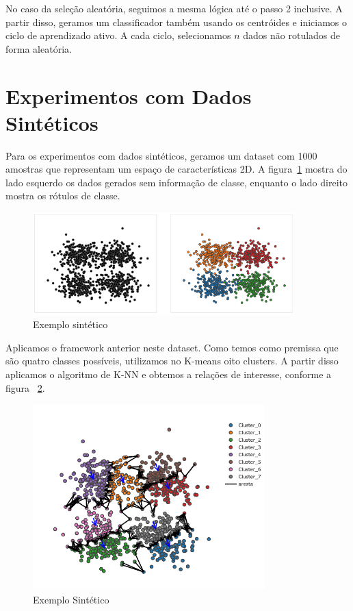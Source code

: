 
No caso da seleção aleatória, seguimos a mesma lógica até o passo 2 inclusive. A partir disso, geramos um classificador também usando os centróides e iniciamos o ciclo de aprendizado ativo. A cada ciclo, selecionamos $n$ dados não rotulados de forma aleatória.

\section{Experimentos com Dados Sintéticos}
\label{sec:experimentos_sinteticos}

Para os experimentos com dados sintéticos, geramos um dataset com 1000 amostras que representam um espaço de características 2D. A figura~\ref{fig:exemplo_sintetico_1} mostra do lado esquerdo os dados gerados sem informação de classe, enquanto o lado direito mostra os rótulos de classe. 


\begin{figure}
  \centering
  \includegraphics[width=0.9\textwidth]{figures/toy_example_1.png}
  \caption{Exemplo sintético}
  \label{fig:exemplo_sintetico_1}
\end{figure}

Aplicamos o framework anterior neste dataset. Como temos como premissa que são quatro classes possíveis, utilizamos no K-means oito clusters. A partir disso aplicamos o algoritmo de K-NN e obtemos a relações de interesse, conforme a figura ~\ref{fig:exemplo_sintetico_2}. 

\begin{figure}
  \centering
  \includegraphics[width=0.8\textwidth]{figures/toy_example_2.png}
  \caption{Exemplo Sintético}
  \label{fig:exemplo_sintetico_2}
\end{figure}

